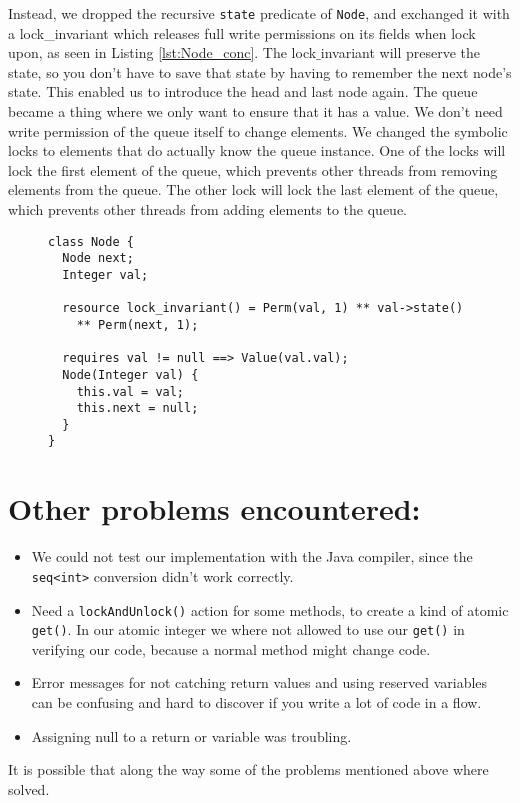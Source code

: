 Instead, we dropped the recursive {\tt state} predicate of {\tt Node}, and exchanged it with a lock\_invariant which releases full write permissions on its fields when lock upon, as seen in Listing \autoref{lst:Node_conc}. The lock$\_$invariant will preserve the state, so you don't have to save that state by having to remember the next node's state. This enabled us to introduce the head and last node again. The queue became a thing where we only want to ensure that it has a value. We don't need write permission of the queue itself to change elements. We changed the symbolic locks to elements that do actually know the queue instance. One of the locks will lock the first element of the queue, which prevents other threads from removing elements from the queue. The other lock will lock the last element of the queue, which prevents other threads from adding elements to the queue.

\begin{figure}
\begin{lstlisting}[caption=Node implementation using a {\tt lock\_invariant}, captionpos=b]
class Node {
  Node next;
  Integer val;
  
  resource lock_invariant() = Perm(val, 1) ** val->state() 
    ** Perm(next, 1);
  
  requires val != null ==> Value(val.val);
  Node(Integer val) {
    this.val = val;
    this.next = null;
  }
}
\end{lstlisting}
\label{lst:Node_conc}
\end{figure}



\section{Other problems encountered:}
\begin{itemize}
	\item We could not test our implementation with the Java compiler, since the {\tt seq<int>} conversion didn't work correctly.
	\item Need a {\tt lockAndUnlock()} action for some methods, to create a kind of atomic {\tt get()}. In our atomic integer we where not allowed to use our {\tt get()} in verifying our code, because a normal method might change code.
	\item Error messages for not catching return values and using reserved variables can be confusing and hard to discover if you write a lot of code in a flow.
	\item Assigning null to a return or variable was troubling.
\end{itemize}

It is possible that along the way some of the problems mentioned above where solved.